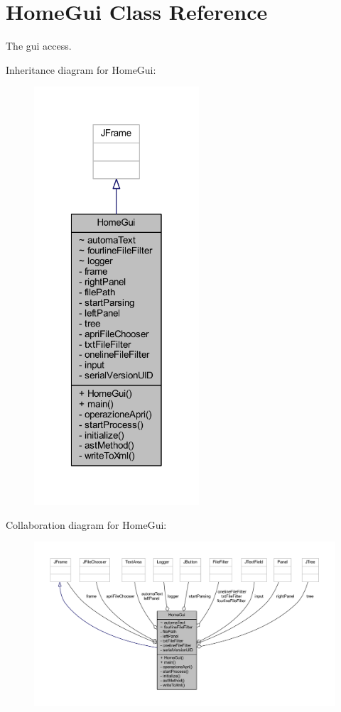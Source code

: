 \hypertarget{class_home_gui}{\section{Home\-Gui Class Reference}
\label{class_home_gui}
}


The gui access.  




Inheritance diagram for Home\-Gui\-:
\nopagebreak
\begin{figure}[H]
\begin{center}
\leavevmode
\includegraphics[width=174pt]{class_home_gui__inherit__graph}
\end{center}
\end{figure}


Collaboration diagram for Home\-Gui\-:
\nopagebreak
\begin{figure}[H]
\begin{center}
\leavevmode
\includegraphics[width=350pt]{class_home_gui__coll__graph}
\end{center}
\end{figure}
